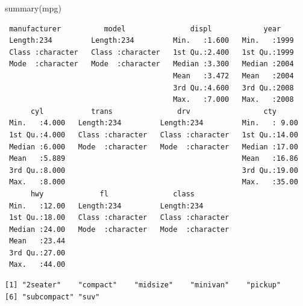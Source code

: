 \documentclass[
  letterpaper,
  DIV=11,
  numbers=noendperiod]{scrreprt}
\newenvironment{Shaded}{\begin{snugshade}}{\end{snugshade}}
\newcommand{\CommentTok}[1]{\textcolor[rgb]{0.37,0.37,0.37}{#1}}
\newcommand{\FunctionTok}[1]{\textcolor[rgb]{0.28,0.35,0.67}{#1}}
\newcommand{\NormalTok}[1]{\textcolor[rgb]{0.00,0.23,0.31}{#1}}
\newcommand{\OtherTok}[1]{\textcolor[rgb]{0.00,0.23,0.31}{#1}}
\newcommand{\SpecialCharTok}[1]{\textcolor[rgb]{0.37,0.37,0.37}{#1}}
\begin{document}
\begin{Shaded}
\begin{Highlighting}[]
\FunctionTok{summary}\NormalTok{(mpg)}
\end{Highlighting}
\end{Shaded}

\begin{verbatim}
 manufacturer          model               displ            year     
 Length:234         Length:234         Min.   :1.600   Min.   :1999  
 Class :character   Class :character   1st Qu.:2.400   1st Qu.:1999  
 Mode  :character   Mode  :character   Median :3.300   Median :2004  
                                       Mean   :3.472   Mean   :2004  
                                       3rd Qu.:4.600   3rd Qu.:2008  
                                       Max.   :7.000   Max.   :2008  
      cyl           trans               drv                 cty       
 Min.   :4.000   Length:234         Length:234         Min.   : 9.00  
 1st Qu.:4.000   Class :character   Class :character   1st Qu.:14.00  
 Median :6.000   Mode  :character   Mode  :character   Median :17.00  
 Mean   :5.889                                         Mean   :16.86  
 3rd Qu.:8.000                                         3rd Qu.:19.00  
 Max.   :8.000                                         Max.   :35.00  
      hwy             fl               class          
 Min.   :12.00   Length:234         Length:234        
 1st Qu.:18.00   Class :character   Class :character  
 Median :24.00   Mode  :character   Mode  :character  
 Mean   :23.44                                        
 3rd Qu.:27.00                                        
 Max.   :44.00                                        
\end{verbatim}

\begin{Shaded}
\end{Shaded}

\begin{verbatim}
[1] "2seater"    "compact"    "midsize"    "minivan"    "pickup"    
[6] "subcompact" "suv"       
\end{verbatim}
\end{document}
